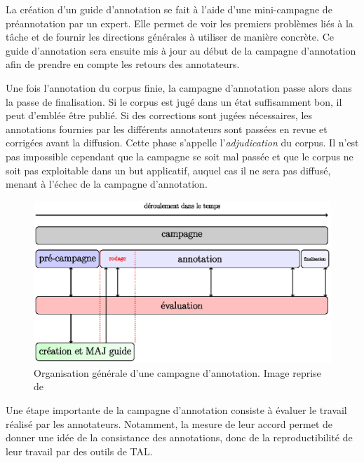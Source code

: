 \documentclass[PhD-Yoann-Dupont.tex]{subfiles}
\begin{document}
La création d'un guide d'annotation se fait à l'aide d'une mini-campagne de préannotation par un expert. Elle permet de voir les premiers problèmes liés à la tâche et de fournir les directions générales à utiliser de manière concrète. Ce guide d'annotation sera ensuite mis à jour au début de la campagne d'annotation afin de prendre en compte les retours des annotateurs.

Une fois l'annotation du corpus finie, la campagne d'annotation passe alors dans la passe de finalisation. Si le corpus est jugé dans un état suffisamment bon, il peut d'emblée être publié. Si des corrections sont jugées nécessaires, les annotations fournies par les différents annotateurs sont passées en revue et corrigées avant la diffusion. Cette phase s'appelle l'\emph{adjudication} du corpus. Il n'est pas impossible cependant que la campagne se soit mal passée et que le corpus ne soit pas exploitable dans un but applicatif, auquel cas il ne sera pas diffusé, menant à l'échec de la campagne d'annotation.

\begin{figure}[ht!]
    \centering
    \includegraphics[scale=1.0]{images/fort/campaign}
    \caption{Organisation générale d'une campagne d'annotation. Image reprise de \citet{fort2012ressources}}
    \label{fig:campaign-organisation}
\end{figure}

Une étape importante de la campagne d'annotation consiste à évaluer le travail réalisé par les annotateurs. Notamment, la mesure de leur accord permet de donner une idée de la consistance des annotations, donc de la reproductibilité de leur travail par des outils de TAL.
\end{document}

